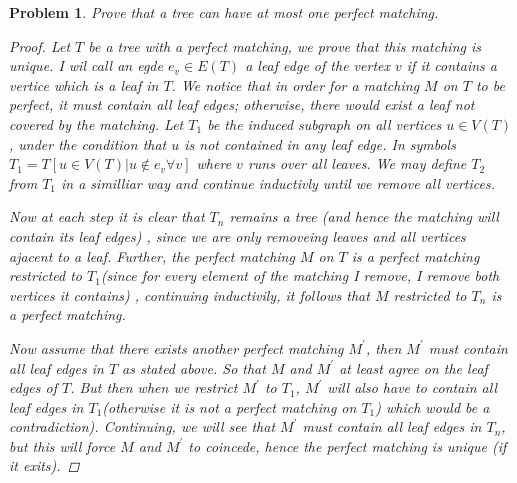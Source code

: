 \documentclass{article} \usepackage{amsmath, amsthm, hyperref}
\newtheorem{prb}{Problem}
\begin{document}
\begin{prb} 
Prove that a tree can have at most one perfect matching. 
\begin{proof} 
Let $T$ be a tree with a perfect matching, we prove that this matching is unique. 
I wil call an egde $e_v \in E(T)$ a \emph{leaf edge} of the vertex $v$ if it contains a vertice which is a leaf in $T$. 
We notice that in order for a matching $M$ on $T$ to be perfect, it must contain all leaf edges; otherwise, 
there would exist a leaf not covered by the matching. Let $T_1$ be the induced subgraph on all vertices $u \in V(T)$, 
under the condition that $u$ is not contained in any leaf edge. In symbols $T_1 = T[{u \in V(T) | u \notin e_v \forall v }]$ where $v$ runs over all leaves. 
We may define $T_2$ from $T_1$ in a similliar way and continue inductivly until we remove all vertices. 

Now at each step it is clear that $T_n$ remains a tree (and hence the matching will contain its leaf edges)
, since we are only removeing leaves and all vertices ajacent to a leaf. Further, 
the perfect matching $M$ on $T$ is a perfect matching restricted to $T_1$(since for every element of the matching I remove, I remove both vertices it contains) 
, continuing inductivily, it follows that $M$ restricted to $T_n$ 
is a perfect matching. 

Now assume that there exists another perfect matching $M^\prime$, then $M^\prime$ must contain all leaf edges in $T$ as stated above.
So that $M$ and $M^\prime$ at least agree on the leaf edges of $T$. 
But then when we restrict $M^\prime $ to $T_1$, $M^\prime$ will also have to contain all leaf edges in $T_1$(otherwise it is not a perfect matching on $T_1$) which would be a contradiction). Continuing, we will see that $M^\prime$ must contain all leaf edges in $T_n$, but this will force $M$ and $M^\prime$ 
to coincede, hence the perfect matching is unique (if it exits). 
\end{proof}
\end{prb} 
\end{document}
